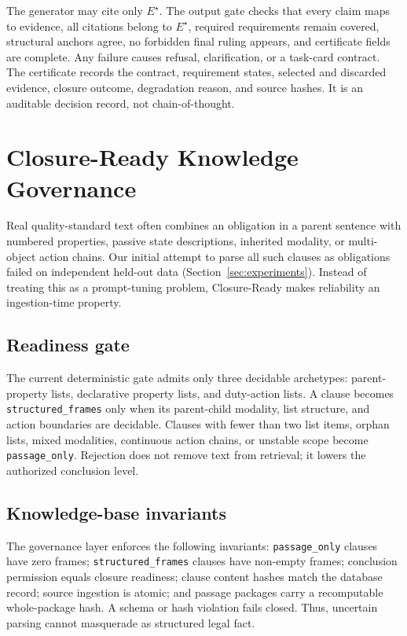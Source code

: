 \documentclass[11pt]{article}
\begin{document}
The generator may cite only $E^\star$. The output gate checks that every claim maps to evidence, all citations belong to $E^\star$, required requirements remain covered, structural anchors agree, no forbidden final ruling appears, and certificate fields are complete. Any failure causes refusal, clarification, or a task-card contract. The certificate records the contract, requirement states, selected and discarded evidence, closure outcome, degradation reason, and source hashes. It is an auditable decision record, not chain-of-thought.

\section{Closure-Ready Knowledge Governance}
\label{sec:governance}

Real quality-standard text often combines an obligation in a parent sentence with numbered properties, passive state descriptions, inherited modality, or multi-object action chains. Our initial attempt to parse all such clauses as obligations failed on independent held-out data (Section~\ref{sec:experiments}). Instead of treating this as a prompt-tuning problem, Closure-Ready makes reliability an ingestion-time property.

\subsection{Readiness gate}

The current deterministic gate admits only three decidable archetypes: parent-property lists, declarative property lists, and duty-action lists. A clause becomes \texttt{structured\_frames} only when its parent-child modality, list structure, and action boundaries are decidable. Clauses with fewer than two list items, orphan lists, mixed modalities, continuous action chains, or unstable scope become \texttt{passage\_only}. Rejection does not remove text from retrieval; it lowers the authorized conclusion level.

\subsection{Knowledge-base invariants}

The governance layer enforces the following invariants: \texttt{passage\_only} clauses have zero frames; \texttt{structured\_frames} clauses have non-empty frames; conclusion permission equals closure readiness; clause content hashes match the database record; source ingestion is atomic; and passage packages carry a recomputable whole-package hash. A schema or hash violation fails closed. Thus, uncertain parsing cannot masquerade as structured legal fact.
\end{document}
